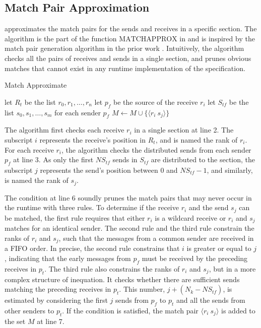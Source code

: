 \subsection{Match Pair Approximation}

 approximates the match pairs for the sends and receives in a specific section.
The algorithm is the part of the function $\mathrm{MATCHAPPROX}$ in  and is inspired by the match pair generation algorithm in the prior work \cite{DBLP:conf/kbse/HuangMM13}. 
Intuitively, the algorithm checks all the pairs of receives and sends in a single section, and prunes obvious matches that cannot exist in any runtime implementation of the specification.

\begin{algorithm}
\caption{Match Approximate}\label{algo:match}
\begin{algorithmic}[1]
\State let $R_t$ be the list $r_0,r_1,\ldots,r_n$
\State let $p_f$ be the source of the receive $r_i$
\State let $S_{tf}$ be the list $s_0,s_1,\ldots,s_m$ for each sender $p_f$
\State $M\gets M\cup\{\langle r_i\ s_j \rangle\}$
\EndIf
\EndFor
\EndFor
\end{algorithmic}
\end{algorithm}

The algorithm first checks each receive $r_i$ in a single section at line 2. The subscript $i$ represents the receive's position in $R_t$, and is named the rank of $r_i$. 
For each receive $r_i$, the algorithm checks the distributed sends from each sender $p_f$ at line 3. As only the first $\mathit{NS_{tf}}$ sends in $S_{tf}$ are distributed to the section, the subscript $j$ represents the send's position between $0$ and $\mathit{NS_{tf}}-1$, and similarly, is named the rank of $s_j$.

The condition at line 6 soundly prunes the match pairs that may never occur in the runtime with three rules. To determine if the receive $r_i$ and the send $s_j$ can be matched, the first rule requires that either $r_i$ is a wildcard receive or $r_i$ and $s_j$ matches for an identical sender. 
The second rule and the third rule constrain the ranks of $r_i$ and $s_j$, such that the messages from a common sender are received in a FIFO order. 
In precise, the second rule constrains that $i$ is greater or equal to $j$, indicating that the early messages from $p_f$ must be received by the preceding receives in $p_t$. 
The third rule also constrains the ranks of $r_i$ and $s_j$, but in a more complex structure of inequation. 
It checks whether there are sufficient sends matching the preceding receives in $p_t$. 
This number, $j + (N_k - \mathit{NS_{tf}})$, is estimated by considering the first $j$ sends from $p_f$ to $p_t$ and all the sends from other senders to $p_t$.
If the condition is satisfied, the match pair $\langle r_i\ s_j\rangle$ is added to the set $M$ at line 7. 


